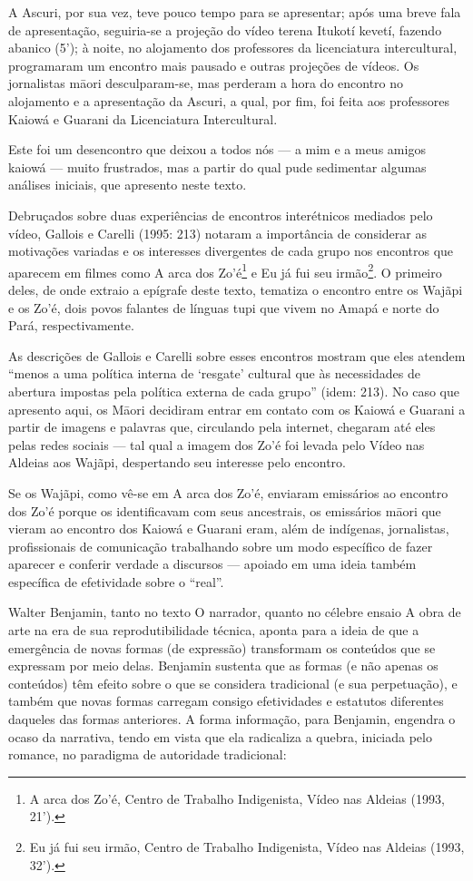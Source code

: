 A Ascuri, por sua vez, teve pouco tempo para se apresentar; após uma
breve fala de apresentação, seguiria-se a projeção do vídeo terena
Itukotí kevetí, fazendo abanico (5’); à noite, no alojamento dos
professores da licenciatura intercultural, programaram um encontro mais
pausado e outras projeções de vídeos. Os jornalistas m\=aori
desculparam-se, mas perderam a hora do encontro no alojamento e a
apresentação da Ascuri, a qual, por fim, foi feita aos professores
Kaiowá e Guarani da Licenciatura Intercultural. 

Este foi um desencontro que deixou a todos nós — a mim e a meus amigos
kaiowá — muito frustrados, mas a partir do qual pude sedimentar algumas
análises iniciais, que apresento neste texto. 

Debruçados sobre duas experiências de encontros interétnicos mediados
pelo vídeo, Gallois e Carelli (1995: 213) notaram a importância de
considerar as motivações variadas e os interesses divergentes de cada
grupo nos encontros que aparecem em filmes como A arca dos
Zo’é\footnote{A arca dos Zo’é, Centro de Trabalho Indigenista, Vídeo
nas Aldeias (1993, 21’).} e Eu já fui seu irmão\footnote{Eu já fui seu
irmão, Centro de Trabalho Indigenista, Vídeo nas Aldeias (1993, 32’).}.
O primeiro deles, de onde extraio a epígrafe deste texto, tematiza o
encontro entre os Wajãpi e os Zo’é, dois povos falantes de línguas tupi
que vivem no Amapá e norte do Pará, respectivamente.

As descrições de Gallois e Carelli sobre esses encontros mostram que
eles atendem ``menos a uma política interna de ‘resgate’ cultural que às
necessidades de abertura impostas pela política externa de cada grupo''
(idem: 213). No caso que apresento aqui, os M\=aori decidiram entrar em
contato com os Kaiowá e Guarani a partir de imagens e palavras que,
circulando pela internet, chegaram até eles pelas redes sociais — tal
qual a imagem dos Zo’é foi levada pelo Vídeo nas Aldeias aos Wajãpi,
despertando seu interesse pelo encontro.

Se os Wajãpi, como vê-se em A arca dos Zo’é, enviaram emissários ao
encontro dos Zo’é porque os identificavam com seus ancestrais, os
emissários m\=aori que vieram ao encontro dos Kaiowá e Guarani eram,
além de indígenas, jornalistas, profissionais de comunicação
trabalhando sobre um modo específico de fazer aparecer e conferir
verdade a discursos — apoiado em uma ideia também específica de
efetividade sobre o ``real''.

Walter Benjamin, tanto no texto O narrador, quanto no célebre ensaio A
obra de arte na era de sua reprodutibilidade técnica, aponta para a
ideia de que a emergência de novas formas (de expressão) transformam os
conteúdos que se expressam por meio delas. Benjamin sustenta que as
formas (e não apenas os conteúdos) têm efeito sobre o que se considera
tradicional (e sua perpetuação), e também que novas formas carregam
consigo efetividades e estatutos diferentes daqueles das formas
anteriores. A forma informação, para Benjamin, engendra o ocaso da
narrativa, tendo em vista que ela radicaliza a quebra, iniciada pelo
romance, no paradigma de autoridade tradicional:


